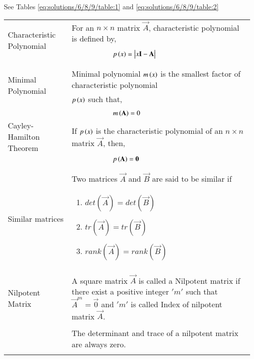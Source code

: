 See Tables     \ref{eq:solutions/6/8/9/table:1}
and     \ref{eq:solutions/6/8/9/table:2}

\begin{table*}[ht!]
\centering
\begin{tabular}{|p{5cm}|p{13cm}|}
    \hline
	\multirow{3}{*}{Characteristic Polynomial} 
	& For an $n\times n$ matrix $\vec{A}$, characteristic polynomial is defined by,\\
	&\\
	& $\qquad\qquad\qquad p\brak{x}=\mydet{x\Vec{I}-\Vec{A}}$\\
	&\\
	\hline
	\multirow{3}{*}{Minimal Polynomial} 
	&\\
	& Minimal polynomial $m\left(x\right)$ is the smallest factor of characteristic polynomial\\
	& $p\left(x\right)$ such that,\\
	&\\
	& $\qquad \qquad \qquad m\left(\mathbf{A}\right)=0$\\
    \hline
    \multirow{3}{*}{Cayley-Hamilton Theorem}
    &\\
    & If $p\left(x\right)$ is the characteristic polynomial of an $n\times n$ matrix $\vec{A}$, then,\\
    &\\
    &$\qquad \qquad \qquad p\left(\mathbf{A}\right)=\mathbf{0}$\\
    &\\
    \hline
    \multirow{3}{*}{Similar matrices}&\\
    &  Two   matrices $\vec{A}$ and $\vec{B}$ are said to be similar if\\
    &{\begin{enumerate}
        \item $det(\vec{A}) = det(\vec{B})$
        
        \item $tr (\vec{A}) = tr (\vec{B})$
       
        \item $rank(\vec{A})=rank(\vec{B})$
    \end{enumerate}}\\
    \hline
    \multirow{3}{*}{Nilpotent Matrix}&\\
    & A square matrix $\vec{A}$ is called a Nilpotent matrix if there exist a positive integer $'m'$ such that $\vec{A}^{m}=\vec{0}$ and $'m'$ is called Index of nilpotent matrix $\vec{A}$.\\
    &\\
   & The determinant and trace of a nilpotent matrix are always zero.\\
   &\\
    \hline
    
\end{tabular}
    \caption{Definitions}
\label{eq:solutions/6/8/9/table:1}
\end{table*}
